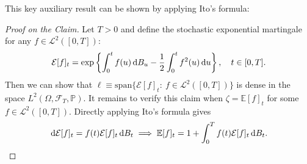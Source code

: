 This key auxiliary result can be shown by applying Ito's formula:
\begin{proof}[Proof on the Claim]
Let $T>0$ and define the stochastic exponential martingale for any $f\in\mathcal{L}^2([0,T])$:
\[
\mathcal{E}[f]_t=\exp\left\{
\int_0^tf(u)\,\mathrm{d} B_u - \frac{1}{2}\int_0^tf^2(u)\,\mathrm{d} u
\right\},\quad t\in[0,T].
\]
Then we can show that $\ell\equiv\text{span}\{\mathcal{E}[f]_t:~f\in\mathcal{L}^2([0,T])\}$ is dense in the space $L^2(\Omega,\mathcal{F}_T,\mathbb{P})$.
It remains to verify this claim when $\zeta=\mathbb{E}[f]_t$ for some $f\in \mathcal{L}^2([0,T])$.
Directly applying Ito's formula gives
\[
\,\mathrm{d}\mathcal{E}[f]_t=f(t)\mathcal{E}[f]_t\,\mathrm{d} B_t\implies
\mathbb{E}[f]_t = 1 + \int_0^Tf(t)\mathcal{E}[f]_t\,\mathrm{d} B_t.
\]
\end{proof}






